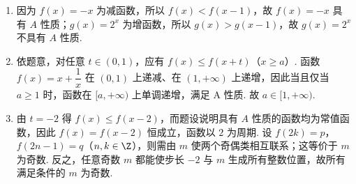 \begin{solution}
\begin{enumerate}
\item 因为 \(f(x)=-x\) 为减函数，所以 \(f(x)<f(x-1)\)，故 \(f(x)=-x\) 具有 \(A\) 性质；\(g(x)=2^x\) 为增函数，所以 \(g(x)>g(x-1)\)，故 \(g(x)=2^x\) 不具有 \(A\) 性质.
\item 依题意，对任意 \(t\in(0,1)\)，应有 \(f(x)\leq f(x+t)\)（\(x\geq a\)）. 函数 \(f(x)=x+\dfrac1x\) 在 \((0,1)\) 上递减、在 \((1,+\infty)\) 上递增，因此当且仅当 \(a\geq1\) 时，函数在 \([a,+\infty)\) 上单调递增，满足 A 性质. 故 \(a\in[1,+\infty)\).
\item 由 \(t=-2\) 得 \(f(x)\leq f(x-2)\)，而题设说明具有 \(A\) 性质的函数均为常值函数，因此 \(f(x)=f(x-2)\) 恒成立，函数以 \(2\) 为周期. 设 \(f(2k)=p\)，\(f(2n-1)=q\)（\(n,k\in\Z\)），则需由 \(m\) 使两个奇偶类相互联系；这等价于 \(m\) 为奇数. 反之，任意奇数 \(m\) 都能使步长 \(-2\) 与 \(m\) 生成所有整数位置，故所有满足条件的 \(m\) 为奇数.
\end{enumerate}
\end{solution}

